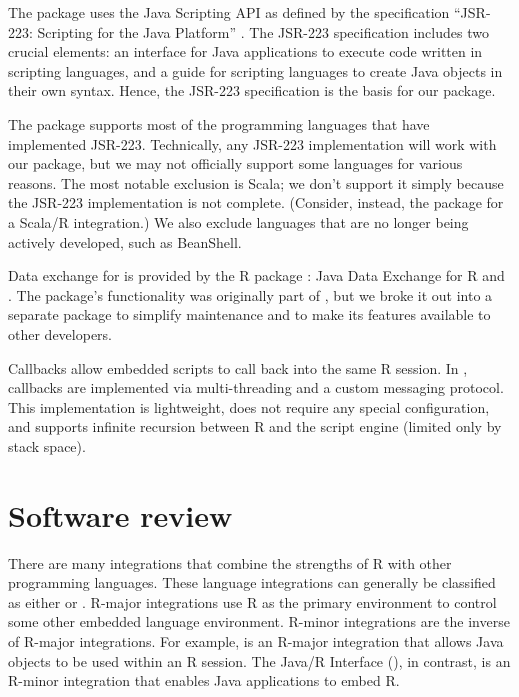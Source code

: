 The  package uses the Java Scripting API \citep{jsa} as defined by the specification “JSR-223: Scripting for the Java Platform” \citep{jsr223spec}. The JSR-223 specification includes two crucial elements: an interface for Java applications to execute code written in scripting languages, and a guide for scripting languages to create Java objects in their own syntax. Hence, the JSR-223 specification is the basis for our package.

The  package supports most of the programming languages that have implemented JSR-223. Technically, any JSR-223 implementation will work with our package, but we may not officially support some languages for various reasons. The most notable exclusion is Scala; we don't support it simply because the JSR-223 implementation is not complete. (Consider, instead, the  package for a Scala/R integration.) We also exclude languages that are no longer being actively developed, such as BeanShell.

Data exchange for  is provided by the R package : Java Data Exchange for R and  \citep{jdx}. The  package's functionality was originally part of , but we broke it out into a separate package to simplify maintenance and to make its features available to other developers. %

Callbacks allow embedded scripts to call back into the same R session. In , callbacks are implemented via multi-threading and a custom messaging protocol. This implementation is lightweight, does not require any special configuration, and supports infinite recursion between R and the script engine (limited only by stack space).

\hypertarget{software-review}{}
\section{Software review}

There are many integrations that combine the strengths of R with other programming languages. These language integrations can generally be classified as either  or . R-major integrations use R as the primary environment to control some other embedded language environment. R-minor integrations are the inverse of R-major integrations. For example,  is an R-major integration that allows Java objects to be used within an R session. The Java/R Interface (), in contrast, is an R-minor integration that enables Java applications to embed R.


